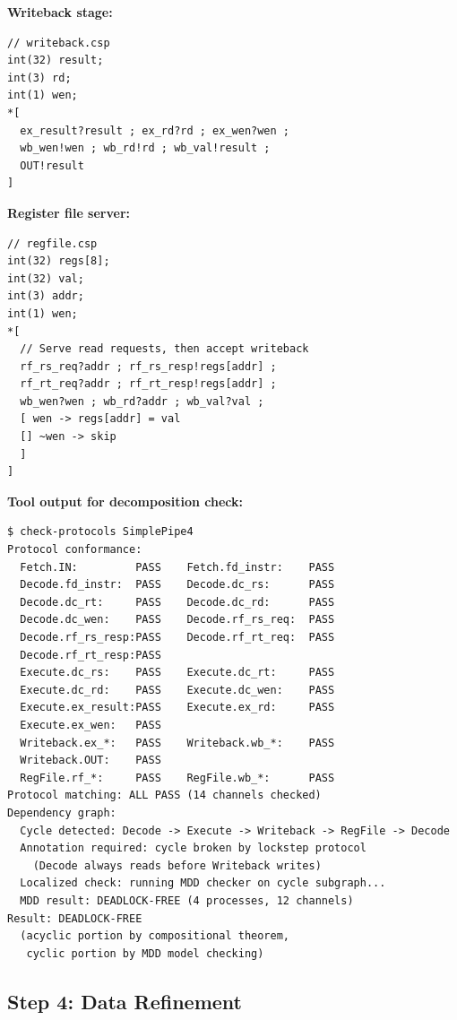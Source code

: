 \documentclass[11pt]{article}
\begin{document}
\textbf{Writeback stage:}

\begin{Verbatim}[samepage=true]
// writeback.csp
int(32) result;
int(3) rd;
int(1) wen;
*[
  ex_result?result ; ex_rd?rd ; ex_wen?wen ;
  wb_wen!wen ; wb_rd!rd ; wb_val!result ;
  OUT!result
]
\end{Verbatim}

\textbf{Register file server:}

\begin{Verbatim}[samepage=true]
// regfile.csp
int(32) regs[8];
int(32) val;
int(3) addr;
int(1) wen;
*[
  // Serve read requests, then accept writeback
  rf_rs_req?addr ; rf_rs_resp!regs[addr] ;
  rf_rt_req?addr ; rf_rt_resp!regs[addr] ;
  wb_wen?wen ; wb_rd?addr ; wb_val?val ;
  [ wen -> regs[addr] = val
  [] ~wen -> skip
  ]
]
\end{Verbatim}

\textbf{Tool output for decomposition check:}
\begin{Verbatim}[samepage=true]
$ check-protocols SimplePipe4
Protocol conformance:
  Fetch.IN:         PASS    Fetch.fd_instr:    PASS
  Decode.fd_instr:  PASS    Decode.dc_rs:      PASS
  Decode.dc_rt:     PASS    Decode.dc_rd:      PASS
  Decode.dc_wen:    PASS    Decode.rf_rs_req:  PASS
  Decode.rf_rs_resp:PASS    Decode.rf_rt_req:  PASS
  Decode.rf_rt_resp:PASS
  Execute.dc_rs:    PASS    Execute.dc_rt:     PASS
  Execute.dc_rd:    PASS    Execute.dc_wen:    PASS
  Execute.ex_result:PASS    Execute.ex_rd:     PASS
  Execute.ex_wen:   PASS
  Writeback.ex_*:   PASS    Writeback.wb_*:    PASS
  Writeback.OUT:    PASS
  RegFile.rf_*:     PASS    RegFile.wb_*:      PASS
Protocol matching: ALL PASS (14 channels checked)
Dependency graph:
  Cycle detected: Decode -> Execute -> Writeback -> RegFile -> Decode
  Annotation required: cycle broken by lockstep protocol
    (Decode always reads before Writeback writes)
  Localized check: running MDD checker on cycle subgraph...
  MDD result: DEADLOCK-FREE (4 processes, 12 channels)
Result: DEADLOCK-FREE
  (acyclic portion by compositional theorem,
   cyclic portion by MDD model checking)
\end{Verbatim}

\subsection{Step 4: Data Refinement}
\end{document}
